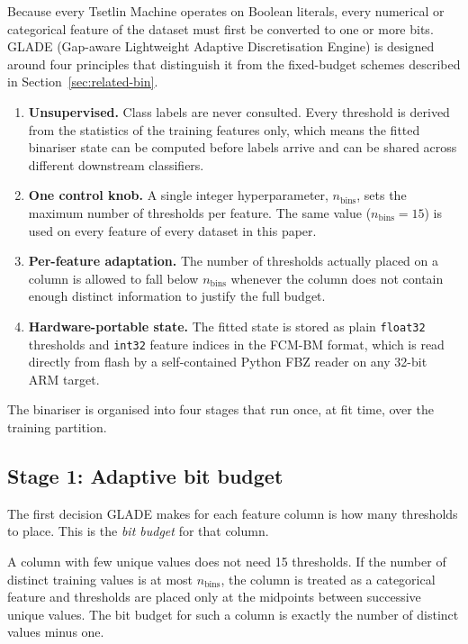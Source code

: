 \documentclass[journal,10pt]{IEEEtran}
\begin{document}
Because every Tsetlin Machine operates on Boolean literals, every
numerical or categorical feature of the dataset must first be
converted to one or more bits. GLADE (Gap-aware Lightweight Adaptive
Discretisation Engine) is designed around four principles that
distinguish it from the fixed-budget schemes described in
Section~\ref{sec:related-bin}.

\begin{enumerate}
  \item \textbf{Unsupervised.} Class labels are never consulted.
        Every threshold is derived from the statistics of the training
        features only, which means the fitted binariser state can be
        computed before labels arrive and can be shared across
        different downstream classifiers.

  \item \textbf{One control knob.} A single integer hyperparameter,
        $n_\text{bins}$, sets the maximum number of thresholds per
        feature. The same value ($n_\text{bins}=15$) is used on
        every feature of every dataset in this paper.

  \item \textbf{Per-feature adaptation.} The number of thresholds
        actually placed on a column is allowed to fall below
        $n_\text{bins}$ whenever the column does not contain enough
        distinct information to justify the full budget.

  \item \textbf{Hardware-portable state.} The fitted state is stored
        as plain \texttt{float32} thresholds and \texttt{int32}
        feature indices in the FCM-BM format, which is read directly
        from flash by a self-contained Python FBZ reader on any 32-bit ARM target.
\end{enumerate}

The binariser is organised into four stages that run once, at fit
time, over the training partition.

\subsection{Stage 1: Adaptive bit budget}
\label{sec:glade-budget}

The first decision GLADE makes for each feature column is how many
thresholds to place. This is the \emph{bit budget} for that column.

A column with few unique values does not need 15 thresholds. If the
number of distinct training values is at most $n_\text{bins}$, the
column is treated as a categorical feature and thresholds are placed
only at the midpoints between successive unique values. The bit
budget for such a column is exactly the number of distinct values
minus one.
\end{document}
